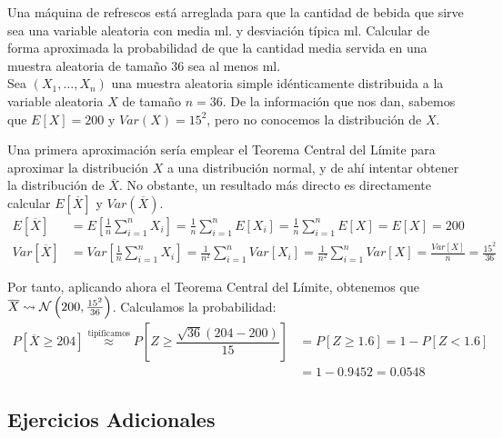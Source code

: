 \begin{ejercicio}
    Una máquina de refrescos está arreglada para que la cantidad de bebida que sirve sea una variable aleatoria con media \unit[200]{ml}. y desviación típica \unit[15]{ml}. Calcular de forma aproximada la probabilidad de que la cantidad media servida en una muestra aleatoria de tamaño 36 sea al menos \unit[204]{ml}.\\

    \noindent
    Sea $(X_1, \ldots, X_n)$ una muestra aleatoria simple idénticamente distribuida a la variable aleatoria $X$ de tamaño $n=36$. De la información que nos dan, sabemos que $E[X] = 200$ y $Var(X) = 15^2$, pero no conocemos la distribución de $X$.

    Una primera aproximación sería emplear el Teorema Central del Límite para aproximar la distribución $X$ a una distribución normal, y de ahí intentar obtener la distribución de $\overline{X}$. No obstante, un resultado más directo es directamente calcular $E[\overline{X}]$ y $Var(\overline{X})$.
    \begin{align*}
        E[\overline{X}] &= E\left[\frac{1}{n}\sum_{i=1}^{n}X_i\right] = \frac{1}{n}\sum_{i=1}^{n}E[X_i] = \frac{1}{n}\sum_{i=1}^{n}E[X] = E[X] = 200 \\
        Var[\overline{X}] &= Var\left[\frac{1}{n}\sum_{i=1}^{n}X_i\right] = \frac{1}{n^2}\sum_{i=1}^{n}Var[X_i] = \frac{1}{n^2}\sum_{i=1}^{n}Var[X] = \frac{Var[X]}{n} = \frac{15^2}{36}
    \end{align*}

    Por tanto, aplicando ahora el Teorema Central del Límite, obtenemos que $\overline{X}\rightsquigarrow\mathcal{N}\left(200, \frac{15^2}{36}\right)$. Calculamos la probabilidad:
    \begin{align*}
        P[\overline{X}\geq 204] \stackrel{\text{tipificamos}}{\approx} P \left[Z \geq \dfrac{\sqrt{36}(204-200)}{15}\right] &= P[Z\geq 1.6] = 1 - P[Z< 1.6] \\
        &= 1 - 0.9452 = 0.0548
    \end{align*}
\end{ejercicio}

\subsection*{Ejercicios Adicionales}

